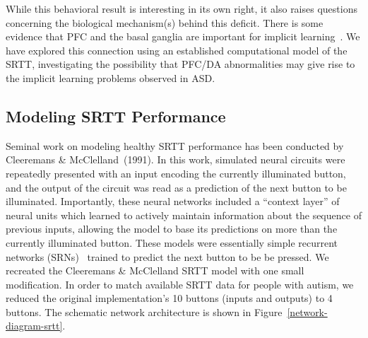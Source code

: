 While this behavioral result is interesting in its own right, it also raises questions concerning the biological mechanism(s) behind this deficit. There is some evidence that PFC and the basal ganglia are important for implicit learning~\cite{RefWorks:109,PascualLeone:2004:PFC_Implicit}. We have explored this connection using an established computational model of the SRTT, investigating the possibility that PFC/DA abnormalities may give rise to the implicit learning problems observed in ASD.


\subsection{Modeling SRTT Performance}
Seminal work on modeling healthy SRTT performance has been conducted by \nocite{Cleeremans:1991:SSRT} Cleeremans \& McClelland~(1991). In this work, simulated neural circuits were repeatedly presented with an input encoding the currently illuminated button, and the output of the circuit was read as a prediction of the next button to be illuminated. Importantly, these neural networks included a ``context layer'' of neural units which learned to actively maintain information about the sequence of previous inputs, allowing the model to base its predictions on more than the currently illuminated button. These models were essentially simple recurrent networks (SRNs)~\cite{ElmanJ:1990:SRN} trained to predict the next button to be be pressed. We recreated the Cleeremans \& McClelland SRTT model with one small modification. In order to match available SRTT data for people with autism, we reduced the original implementation's 10 buttons (inputs and outputs) to 4 buttons. The schematic network architecture is shown in Figure~\ref{network-diagram-srtt}.  

